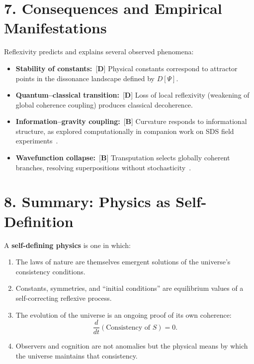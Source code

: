 \documentclass[11pt]{article}
\newcommand{\CatB}{\textbf{B}}
\newcommand{\CatD}{\textbf{D}}
\begin{document}
\section*{7. Consequences and Empirical Manifestations}

Reflexivity predicts and explains several observed phenomena:
\begin{itemize}[nosep]
  \item \textbf{Stability of constants:}~[$\CatD$] Physical
    constants correspond to attractor points in the dissonance
    landscape defined by $D[\Psi]$.
  \item \textbf{Quantum--classical transition:}~[$\CatD$] Loss of
    local reflexivity (weakening of global coherence coupling)
    produces classical decoherence.
  \item \textbf{Information--gravity coupling:}~[$\CatB$] Curvature
    responds to informational structure, as explored computationally in
    companion work on SDS field experiments~\cite{SpivackNEMSHub}.
  \item \textbf{Wavefunction collapse:}~[$\CatB$] Transputation
    selects globally coherent branches, resolving superpositions
    without stochasticity~\cite{SpivackNEMS76}.
\end{itemize}

\section*{8. Summary: Physics as Self-Definition}

A \textbf{self-defining physics} is one in which:
\begin{enumerate}[nosep]
  \item The laws of nature are themselves emergent solutions of the
    universe's consistency conditions.
  \item Constants, symmetries, and ``initial conditions'' are
    equilibrium values of a self-correcting reflexive process.
  \item The evolution of the universe is an ongoing proof of its own
    coherence:
    \[
    \frac{d}{dt}(\text{Consistency of }S) = 0.
    \]
  \item Observers and cognition are not anomalies but the physical means
    by which the universe maintains that consistency.
\end{enumerate}
\end{document}
